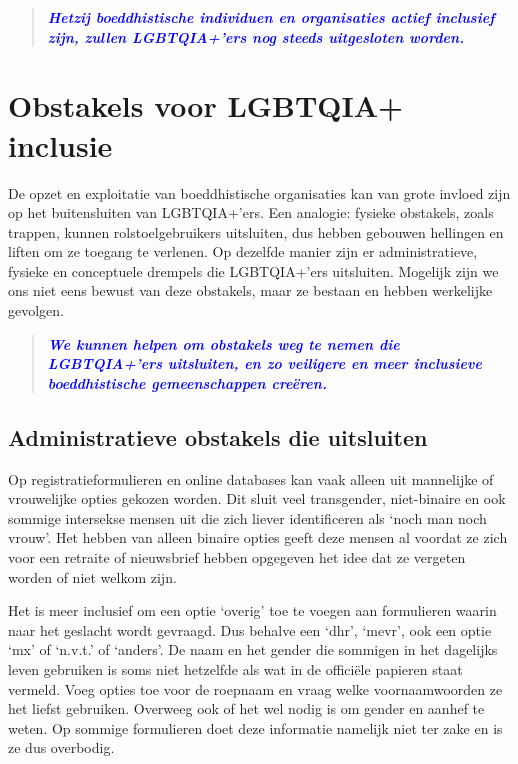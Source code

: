 \documentclass[12pt,openany]{book}
\begin{document}
\begin{quote}
\centering
\doublespacing
\textit{\Large \textcolor{blue}{\textbf{Hetzij boeddhistische individuen en organisaties actief inclusief zijn, zullen LGBTQIA+'ers nog steeds uitgesloten worden.}}}
\end{quote}

\chapter*{Obstakels voor LGBTQIA+ inclusie}

De opzet en exploitatie van boeddhistische organisaties kan van grote invloed zijn op het buitensluiten van LGBTQIA+'ers. Een analogie: fysieke obstakels, zoals trappen, kunnen rolstoelgebruikers uitsluiten, dus hebben gebouwen hellingen en liften om ze toegang te verlenen. Op dezelfde manier zijn er administratieve, fysieke en conceptuele drempels die LGBTQIA+'ers uitsluiten. Mogelijk zijn we ons niet eens bewust van deze obstakels, maar ze bestaan en hebben werkelijke gevolgen.

\begin{quote}
\centering
\doublespacing
\textit{\Large \textcolor{blue}{\textbf{We kunnen helpen om obstakels weg te nemen die \mbox{LGBTQIA+'ers} uitsluiten, en zo veiligere en meer inclusieve boeddhistische gemeenschappen creëren.}}}
\end{quote}

\section*{Administratieve obstakels die uitsluiten}

Op registratieformulieren en online databases kan vaak alleen uit mannelijke of vrouwelijke opties gekozen worden.  Dit sluit veel transgender, niet-binaire en ook sommige intersekse mensen uit die zich liever identificeren als `noch man noch vrouw'. Het hebben van alleen binaire opties geeft deze mensen al voordat ze zich voor een retraite of nieuwsbrief hebben opgegeven het idee dat ze vergeten worden of niet welkom zijn.

Het is meer inclusief om een optie `overig' toe te voegen aan formulieren waarin naar het geslacht wordt gevraagd. Dus behalve een `dhr', `mevr', ook een optie `mx' of `n.v.t.' of `anders'. De naam en het gender die sommigen in het dagelijks leven gebruiken is soms niet hetzelfde als wat in de officiële papieren staat vermeld. Voeg opties toe voor de roepnaam en vraag welke voornaamwoorden ze het liefst gebruiken. Overweeg ook of het wel nodig is om gender en aanhef te weten. Op sommige formulieren doet deze informatie namelijk niet ter zake en is ze dus overbodig.
\end{document}
